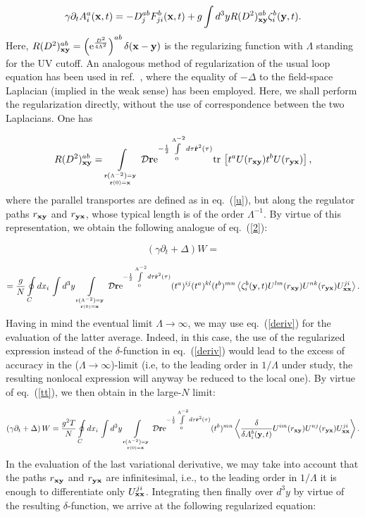 \documentclass[a4paper,12pt]{article}
\begin{document}
$$\gamma\partial_t A_i^a({\bf x},t)=-D_j^{ab}F_{ji}^b({\bf x},t)+g\int d^3yR(D^2)_{\bf xy}^{ab}\zeta_i^b({\bf y},t).$$
Here,
$R(D^2)_{\bf xy}^{ab}=\left({\rm e}^{\frac{D^2}{4\Lambda^2}}\right)^{ab}\delta({\bf x}-{\bf y})$
is the regularizing function with $\Lambda$ standing for the UV cutoff. An analogous method of regularization of the usual
loop equation has been used in ref.~\cite{mh}, where the equality of $-\Delta$ to the field-space Laplacian
(implied in the weak sense) has been employed. Here, we shall perform the regularization directly, without
the use of correspondence between the two Laplacians. One has

$$
R(D^2)_{\bf xy}^{ab}=\int\limits_{{{\bf r}\left(\Lambda^{-2}\right)={\bf y}}\atop
{{\bf r}(0)={\bf x}}}^{}{\cal D}{\bf r}
{\rm e}^{-\frac12\int\limits_{0}^{\Lambda^{-2}}d\tau\dot{\bf r}^2(\tau)}{\rm tr}{\,}\left[t^aU(r_{\bf xy})t^b
U(r_{\bf yx})\right],$$
where the parallel transportes are defined as in eq.~(\ref{u}), but along the regulator paths $r_{\bf xy}$ and
$r_{\bf yx}$, whose typical length is of the order $\Lambda^{-1}$. By virtue of this representation, we obtain the
following analogue of eq.~(\ref{2}):

$$\left(\gamma\partial_t+\Delta\right)W=$$

$$=\frac{g}{N}
\oint\limits_{C}^{} dx_i{\,}\int d^3y\int\limits_{{{\bf r}\left(\Lambda^{-2}\right)={\bf y}}\atop
{{\bf r}(0)={\bf x}}}^{}
{\cal D}{\bf r}
{\rm e}^{-\frac12\int\limits_{0}^{\Lambda^{-2}}d\tau\dot{\bf r}^2(\tau)}
(t^a)^{ij}(t^a)^{kl}(t^b)^{mn}\left<\zeta_i^b({\bf y},t)U^{lm}(r_{\bf xy})U^{nk}(r_{\bf yx})U_{\bf xx}^{ji}\right>.$$
Having in mind the eventual limit $\Lambda\to\infty$, we may use eq.~(\ref{deriv}) for the evaluation of the latter average.
Indeed, in this case, the use of the regularized expression instead of the $\delta$-function in eq.~(\ref{deriv}) would lead
to the excess of accuracy in the ($\Lambda\to\infty$)-limit (i.e, to the leading order in $1/\Lambda$ under study,
the resulting nonlocal expression will anyway be reduced
to the local one). By virtue of eq.~(\ref{tt}), we then obtain in the
large-$N$ limit:

$$\left(\gamma\partial_t+\Delta\right)W=\frac{g^2T}{N}
\oint\limits_{C}^{} dx_i{\,}\int d^3y\int\limits_{{{\bf r}\left(\Lambda^{-2}\right)={\bf y}}\atop
{{\bf r}(0)={\bf x}}}^{}
{\cal D}{\bf r}
{\rm e}^{-\frac12\int\limits_{0}^{\Lambda^{-2}}d\tau\dot{\bf r}^2(\tau)}
(t^b)^{mn}\left<\frac{\delta}{\delta A_i^b({\bf y},t)}U^{im}(r_{\bf xy})U^{nj}(r_{\bf yx})U_{\bf xx}^{ji}\right>.$$
In the evaluation of the last variational derivative, we may take
into account that the paths $r_{\bf xy}$ and $r_{\bf yx}$ are infinitesimal, i.e., to the leading order in
$1/\Lambda$ it is enough to differentiate only $U_{\bf xx}^{ji}$. Integrating then finally over $d^3y$ by virtue
of the resulting $\delta$-function, we arrive at the following regularized equation:
\end{document}
